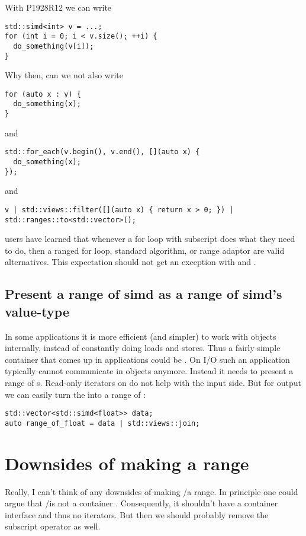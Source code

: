 With P1928R12 we can write
\medskip\begin{lstlisting}
std::simd<int> v = ...;
for (int i = 0; i < v.size(); ++i) {
  do_something(v[i]);
}
\end{lstlisting}

Why then, can we not also write
\medskip\begin{lstlisting}
for (auto x : v) {
  do_something(x);
}
\end{lstlisting}
and
\medskip\begin{lstlisting}
std::for_each(v.begin(), v.end(), [](auto x) {
  do_something(x);
});
\end{lstlisting}
and
\medskip\begin{lstlisting}
v | std::views::filter([](auto x) { return x > 0; }) | std::ranges::to<std::vector>();
\end{lstlisting}

\CC{} users have learned that whenever a for loop with subscript does what they need to do, then a
ranged for loop, standard algorithm, or range adaptor are valid alternatives.
This expectation should not get an exception with \simd and \mask.

\subsection{Present a range of simd as a range of simd's value-type}

In some applications it is more efficient (and simpler) to work with \simd objects internally,
instead of constantly doing loads and stores.
Thus a fairly simple container that comes up in applications could be
.
On I/O such an application typically cannot communicate in \simd objects anymore.
Instead it needs to present a range of s.
Read-only iterators on \simd do not help with the input side.
But for output we can easily turn the  into a range of :
\medskip\begin{lstlisting}
std::vector<std::simd<float>> data;
auto range_of_float = data | std::views::join;
\end{lstlisting}

\section{Downsides of making  a range}

Really, I can't think of any downsides of making \simd/\mask a range.
In principle one could argue that \simd/\mask is not a container \cite{P0851R0}.
Consequently, it shouldn't have a container interface and thus no iterators.
But then we should probably remove the subscript operator as well.

